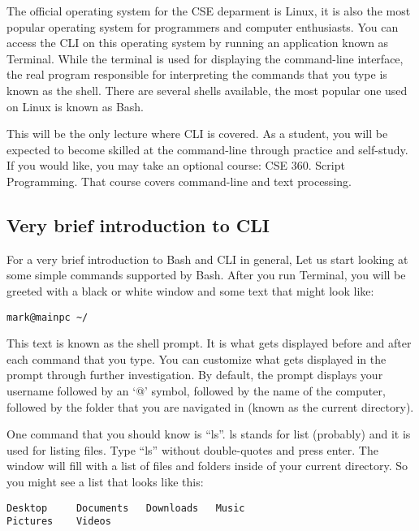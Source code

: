 \documentclass[a4paper,12pt]{article}
\begin{document}
The official operating system for the CSE deparment is Linux, it is also the most popular operating system for programmers and computer enthusiasts. You can access the CLI on this operating system by running an application known as Terminal. While the terminal is used for displaying the command-line interface, the real program responsible for interpreting the commands that you type is known as the shell. There are several shells available, the most popular one used on Linux is known as Bash.

This will be the only lecture where CLI is covered. As a student, you will be expected to become skilled at the command-line through practice and self-study. If you would like, you may take an optional course: CSE 360. Script Programming. That course covers command-line and text processing.


\subsection*{Very brief introduction to CLI}

For a very brief introduction to Bash and CLI in general, Let us start looking at some simple commands supported by Bash. After you run Terminal, you will be greeted with a black or white window and some text that might look like:

\begin{lstlisting}
mark@mainpc ~/
\end{lstlisting}

This text is known as the shell prompt. It is what gets displayed before and after each command that you type. You can customize what gets displayed in the prompt through further investigation. By default, the prompt displays your username followed by an `@' symbol, followed by the name of the computer, followed by the folder that you are navigated in (known as the current directory).

One command that you should know is ``ls''. ls stands for list (probably) and it is used for listing files. Type ``ls'' without double-quotes and press enter. The window will fill with a list of files and folders inside of your current directory. So you might see a list that looks like this:

\begin{lstlisting}
Desktop		Documents	Downloads	Music
Pictures	Videos
\end{lstlisting}
\end{document}
